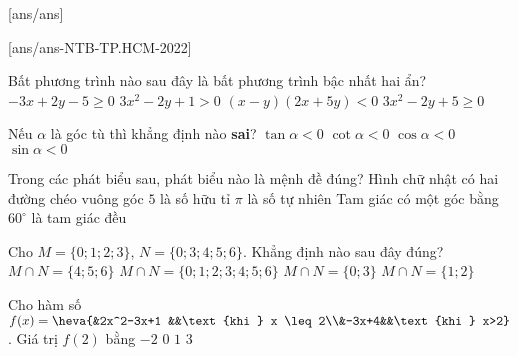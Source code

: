


[ans/ans]

[ans/ans-NTB-TP.HCM-2022]
	\begin{ex}%
	Bất phương trình nào sau đây là bất phương trình bậc nhất hai ẩn?
	\choice
	{\True $-3x+2y-5 \ge 0$}
	{$3x^2-2y+1>0$}
	{$(x-y)(2x+5y)<0$}
	{$3x^2-2y+5 \ge 0$}
\end{ex}

\begin{ex}%
	Nếu $\alpha$ là góc tù thì khẳng định nào \textbf{sai}?
	\choice
	{$\tan\alpha<0$}
	{$\cot\alpha<0$}
	{$\cos\alpha<0$}
	{\True $\sin\alpha<0$}
\end{ex}

\begin{ex}%
	Trong các phát biểu sau, phát biểu nào là mệnh đề đúng?
	\choice
	{Hình chữ nhật có hai đường chéo vuông góc}
	{\True $5$ là số hữu tỉ}
	{$\pi$ là số tự nhiên}
	{Tam giác có một góc bằng $60^{\circ}$ là tam giác đều}
\end{ex}

\begin{ex}%
	Cho $M=\big\{0;1;2;3\big\}$, $N=\big\{0;3;4;5;6\big\}$. Khẳng định nào sau đây đúng?
	\choice
	{$M \cap N=\big\{4;5;6\big\}$}
	{$M \cap N=\big\{0;1;2;3;4;5;6\big\}$}
	{\True $M \cap N=\big\{0;3\big\}$}
	{$M \cap N=\big\{1;2\big\}$}
\end{ex}

\begin{ex}%
	Cho hàm số $f(x)=\heva{&2x^2-3x+1 &&\text{khi } x \leq 2\\&-3x+4&&\text{khi } x>2}$. Giá trị $f(2)$ bằng
	\choice
	{$-2$}
	{$0$}
	{$1$}
	{\True $3$}
\end{ex}

